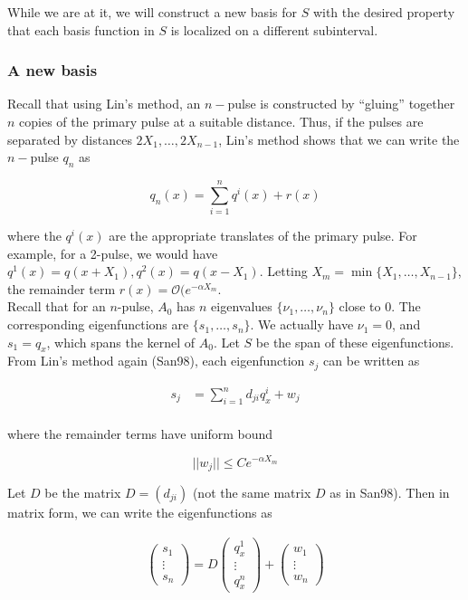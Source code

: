 \documentclass[12pt]{article}
\begin{document}
While we are at it, we will construct a new basis for $S$ with the desired property that each basis function in $S$ is localized on a different subinterval.

\subsubsection{A new basis}

Recall that using Lin's method, an $n-$pulse is constructed by ``gluing'' together $n$ copies of the primary pulse at a suitable distance. Thus, if the pulses are separated by distances $2 X_1, \dots, 2 X_{n-1}$, Lin's method shows that we can write the $n-$pulse $q_n$ as

\[
q_n(x) = \sum_{i = 1}^n q^i(x) + r(x)
\]

where the $q^i(x)$ are the appropriate translates of the primary pulse. For example, for a 2-pulse, we would have $q^1(x) = q(x + X_1), q^2(x) = q(x - X_1)$. Letting $X_m = \min\{ X_1, \dots, X_{n-1} \}$, the remainder term $r(x) = \mathcal{O}(e^{-\alpha X_m}$.\\

Recall that for an $n$-pulse, $A_0$ has $n$ eigenvalues $\{ \nu_1, \dots, \nu_n \}$ close to 0. The corresponding eigenfunctions are $\{ s_1, \dots, s_n \}$. We actually have $\nu_1 = 0$, and $s_1 = q_x$, which spans the kernel of $A_0$. Let $S$ be the span of these eigenfunctions. \\

From Lin's method again (San98), each eigenfunction $s_j$ can be written as

\begin{align*}
s_j &= \sum_{i = 1}^n d_{ji} q^i_x + w_j \\ 
\end{align*}

where the remainder terms have uniform bound 

\[
||w_j|| \leq C e^{-\alpha X_m}
\]

Let $D$ be the matrix $D = (d_{ji})$ (not the same matrix $D$ as in San98). Then in matrix form, we can write the eigenfunctions as 

\begin{align*}
\begin{pmatrix}s_1 \\ \vdots \\ s_n \end{pmatrix} 
= D \begin{pmatrix}q^1_x \\ \vdots \\ q^n_x \end{pmatrix} 
+ \begin{pmatrix}w_1 \\ \vdots \\ w_n \end{pmatrix}  \\ 
\end{align*}
\end{document}

